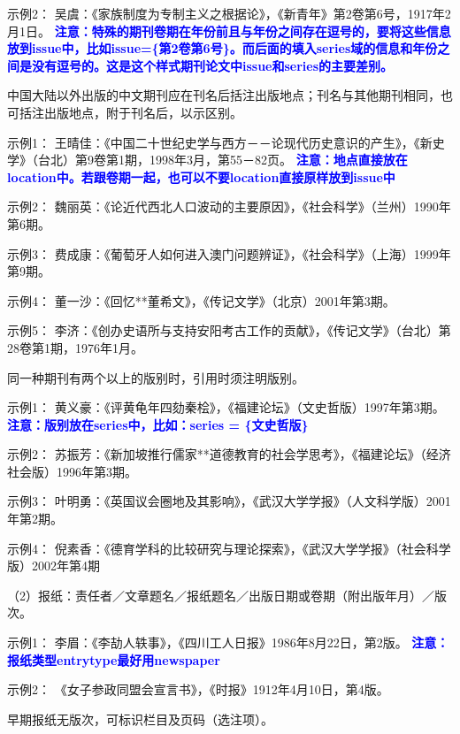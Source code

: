 \documentclass{article}
\newcommand{\qd}[1]{\textbf{\textcolor{blue}{#1}}}
\begin{document}
示例2：
吴虞：《家族制度为专制主义之根据论》，《新青年》第2卷第6号，1917年2月1日。
 \qd{注意：特殊的期刊卷期在年份前且与年份之间存在逗号的，要将这些信息放到issue中，比如issue=\{第2卷第6号\}。而后面的填入series域的信息和年份之间是没有逗号的。这是这个样式期刊论文中issue和series的主要差别。}

中国大陆以外出版的中文期刊应在刊名后括注出版地点；刊名与其他期刊相同，也可括注出版地点，附于刊名后，以示区别。

示例1：
王晴佳：《中国二十世纪史学与西方－－论现代历史意识的产生》，《新史学》（台北）第9卷第1期，1998年3月，第55－82页。
\qd{注意：地点直接放在location中。若跟卷期一起，也可以不要location直接原样放到issue中}

示例2：
魏丽英：《论近代西北人口波动的主要原因》，《社会科学》（兰州）1990年第6期。

示例3：
费成康：《葡萄牙人如何进入澳门问题辨证》，《社会科学》（上海）1999年第9期。

示例4：
董一沙：《回忆**董希文》，《传记文学》（北京）2001年第3期。

示例5：
李济：《创办史语所与支持安阳考古工作的贡献》，《传记文学》（台北）第28卷第1期，1976年1月。


同一种期刊有两个以上的版别时，引用时须注明版别。

示例1：
黄义豪：《评黄龟年四劾秦桧》，《福建论坛》（文史哲版）1997年第3期。
\qd{注意：版别放在series中，比如：series = \{文史哲版\}}

示例2：
苏振芳：《新加坡推行儒家**道德教育的社会学思考》，《福建论坛》（经济社会版）1996年第3期。

示例3：
叶明勇：《英国议会圈地及其影响》，《武汉大学学报》（人文科学版）2001年第2期。

示例4：
倪素香：《德育学科的比较研究与理论探索》，《武汉大学学报》（社会科学版）2002年第4期

（2）报纸：责任者／文章题名／报纸题名／出版日期或卷期（附出版年月）／版次。

示例1：
李眉：《李劼人轶事》，《四川工人日报》1986年8月22日，第2版。
\qd{注意：报纸类型entrytype最好用newspaper}

示例2：
《女子参政同盟会宣言书》，《时报》1912年4月10日，第4版。

早期报纸无版次，可标识栏目及页码（选注项）。
\end{document}

